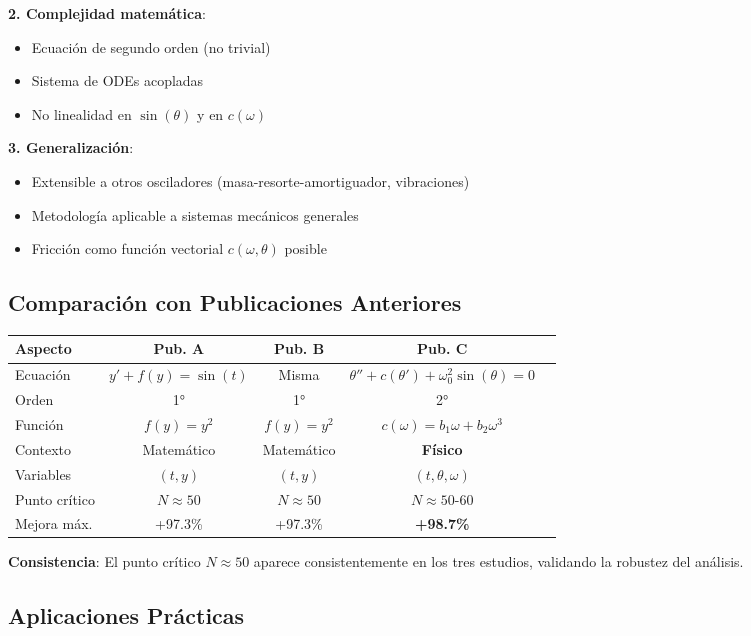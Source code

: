 \documentclass[11pt,a4paper]{article}
\begin{document}
\textbf{2. Complejidad matemática}:
\begin{itemize}
\item Ecuación de segundo orden (no trivial)
\item Sistema de ODEs acopladas
\item No linealidad en $\sin(\theta)$ y en $c(\omega)$
\end{itemize}

\textbf{3. Generalización}:
\begin{itemize}
\item Extensible a otros osciladores (masa-resorte-amortiguador, vibraciones)
\item Metodología aplicable a sistemas mecánicos generales
\item Fricción como función vectorial $c(\omega, \theta)$ posible
\end{itemize}

\subsection{Comparación con Publicaciones Anteriores}

\begin{table}[H]
\centering
\small
\begin{tabular}{lcccc}
\toprule
\textbf{Aspecto} & \textbf{Pub. A} & \textbf{Pub. B} & \textbf{Pub. C} \\
\midrule
Ecuación & $y' + f(y) = \sin(t)$ & Misma & $\theta'' + c(\theta') + \omega_0^2 \sin(\theta) = 0$ \\
Orden & 1° & 1° & 2° \\
Función & $f(y) = y^2$ & $f(y) = y^2$ & $c(\omega) = b_1 \omega + b_2 \omega^3$ \\
Contexto & Matemático & Matemático & \textbf{Físico} \\
Variables & $(t, y)$ & $(t, y)$ & $(t, \theta, \omega)$ \\
Punto crítico & $N \approx 50$ & $N \approx 50$ & $N \approx 50$-$60$ \\
Mejora máx. & +97.3\% & +97.3\% & \textbf{+98.7\%} \\
\bottomrule
\end{tabular}
\end{table}

\textbf{Consistencia}: El punto crítico $N \approx 50$ aparece consistentemente en los tres estudios, validando la robustez del análisis.

\subsection{Aplicaciones Prácticas}
\end{document}
